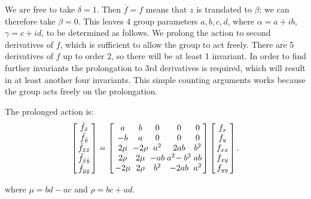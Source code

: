 \documentclass[review,onefignum,onetabnum]{siamonline190516}
\begin{document}
We are free to take $\delta=1$. Then $\bar f = f$ means that $z$ is translated to $\beta$; we can therefore take $\beta=0$. This leaves 4 group parameters $a,b,c,d$, where $\alpha = a + i b$, $\gamma = c + i d$, to be determined as follows. We prolong the action to second derivatives of $f$, which is sufficient to allow the group to act freely. There are 5 derivatives of $f$ up to order 2, so there will be at least 1 invariant. In order to find further invariants the prolongation to 3rd derivatives is required, which will result in at least another four invariants. This simple counting arguments works because the group acts freely on the prolongation. %

The prolonged action is:
\begin{equation}
\arraycolsep=1.4pt
\left[
\begin{array}{c}
  \bar f_{\bar x} \\ \bar f_{\bar y} \\ \bar f_{\bar x \bar x} \\ \bar f_{\bar x \bar y} \\ \bar f_{\bar y \bar y} 
 \end{array}
 \right]
 = 
\left[
\begin{array}{ccccc}
 a & b & 0 & 0 & 0 \\
 -b & a & 0 & 0 & 0 \\
 2\mu & -2 \rho & a^2 & 2 a b & b^2 \\
 2 \rho & 2\mu & -a b & a^2\!-b^2 & a b \\
 -2\mu & 2 \rho & b^2 & -2 a b & a^2 \\
\end{array}
\right]\left[
\begin{array}{c}
f_x \\ f_y \\ f_{xx} \\ f_{xy} \\ f_{yy} \\
 \end{array}
 \right].
\label{eqn:mobius}
 \end{equation}

\noindent where $\mu = b d - a c$ and $\rho = b c + a d$.
\end{document}
